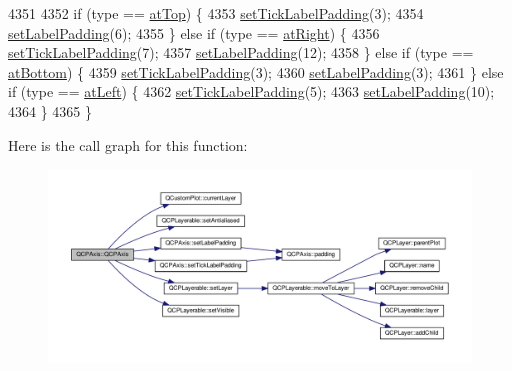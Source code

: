 \begin{DoxyCode}
4351 
4352   \textcolor{keywordflow}{if} (type == \hyperlink{class_q_c_p_axis_ae2bcc1728b382f10f064612b368bc18aac0ece2b680d3f545e701f75af1655977}{atTop}) \{
4353     \hyperlink{class_q_c_p_axis_af302c479af9dbc2e9f0e44e07c0012ee}{setTickLabelPadding}(3);
4354     \hyperlink{class_q_c_p_axis_a4391192a766e5d20cfe5cbc17607a7a2}{setLabelPadding}(6);
4355   \} \textcolor{keywordflow}{else} \textcolor{keywordflow}{if} (type == \hyperlink{class_q_c_p_axis_ae2bcc1728b382f10f064612b368bc18aadf5509f7d29199ef2f263b1dd224b345}{atRight}) \{
4356     \hyperlink{class_q_c_p_axis_af302c479af9dbc2e9f0e44e07c0012ee}{setTickLabelPadding}(7);
4357     \hyperlink{class_q_c_p_axis_a4391192a766e5d20cfe5cbc17607a7a2}{setLabelPadding}(12);
4358   \} \textcolor{keywordflow}{else} \textcolor{keywordflow}{if} (type == \hyperlink{class_q_c_p_axis_ae2bcc1728b382f10f064612b368bc18aa220d68888516b6c3b493d144f1ba438f}{atBottom}) \{
4359     \hyperlink{class_q_c_p_axis_af302c479af9dbc2e9f0e44e07c0012ee}{setTickLabelPadding}(3);
4360     \hyperlink{class_q_c_p_axis_a4391192a766e5d20cfe5cbc17607a7a2}{setLabelPadding}(3);
4361   \} \textcolor{keywordflow}{else} \textcolor{keywordflow}{if} (type == \hyperlink{class_q_c_p_axis_ae2bcc1728b382f10f064612b368bc18aaf84aa6cac6fb6099f54a2cbf7546b730}{atLeft}) \{
4362     \hyperlink{class_q_c_p_axis_af302c479af9dbc2e9f0e44e07c0012ee}{setTickLabelPadding}(5);
4363     \hyperlink{class_q_c_p_axis_a4391192a766e5d20cfe5cbc17607a7a2}{setLabelPadding}(10);
4364   \}
4365 \}
\end{DoxyCode}


Here is the call graph for this function\+:\nopagebreak
\begin{figure}[H]
\begin{center}
\leavevmode
\includegraphics[width=350pt]{class_q_c_p_axis_ac62c042968bae0e6d474fcfc57c9b71f_cgraph}
\end{center}
\end{figure}


\hypertarget{class_q_c_p_axis_a7cfa27ea9da0bb1fe0ae995572c0b85d}{}
